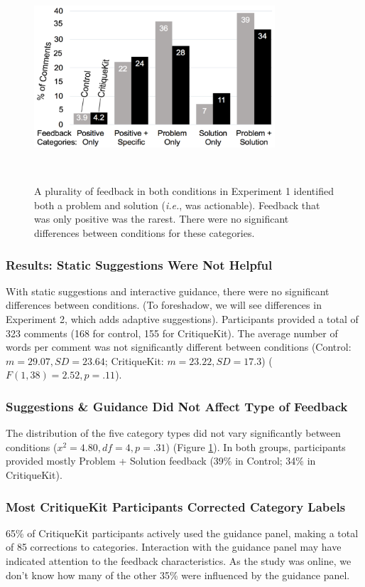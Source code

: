 \begin{figure}[b!]
\centering
  \includegraphics[width=0.8\textwidth]{critiquekit/figures/exp1_feedbacktypes.png}
  \caption{A plurality of feedback in both conditions in Experiment 1 identified both a problem and solution (\textit{i.e.}, was actionable). Feedback that was only positive was the rarest. There were no significant differences between conditions for these categories.}~\label{fig:critiquekit_exp1_results}
\end{figure}

\subsubsection{Results: Static Suggestions Were Not Helpful}
With static suggestions and interactive guidance, there were no significant differences between conditions. (To foreshadow, we will see differences in Experiment 2, which adds adaptive suggestions). Participants provided a total of 323 comments (168 for control, 155 for CritiqueKit). The average number of words per comment was not significantly different between conditions (Control: $m = 29.07, SD = 23.64$; CritiqueKit: $m = 23.22, SD = 17.3$) ($F(1,38) = 2.52, p = .11$).

\subsubsection{Suggestions \& Guidance Did Not Affect Type of Feedback}
The distribution of the five category types did not vary significantly between conditions ($x^2 = 4.80, df = 4, p = .31$) (Figure \ref{fig:critiquekit_exp1_results}). In both groups, participants provided mostly Problem + Solution feedback (39\% in Control; 34\% in CritiqueKit). 

\subsubsection{Most CritiqueKit Participants Corrected Category Labels}
65\% of CritiqueKit participants actively used the guidance panel, making a total of 85 corrections to categories. Interaction with the guidance panel may have indicated attention to the feedback characteristics. As the study was online, we don't know how many of the other 35\% were influenced by the guidance panel. 

